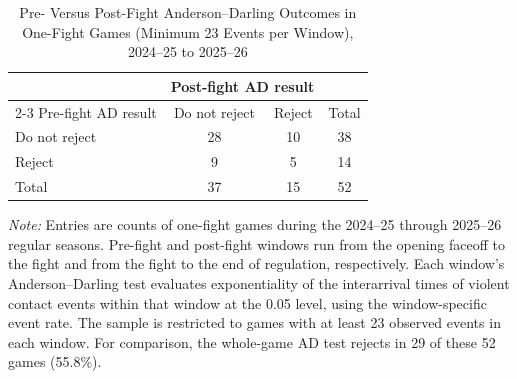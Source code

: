 \begin{table}[htbp]
\centering
\caption{Pre- Versus Post-Fight Anderson--Darling Outcomes in One-Fight Games (Minimum 23 Events per Window), 2024--25 to 2025--26}
\label{tab:one_fight_AD_rejection_min_23_20242025_20252026}
\small
\renewcommand{\arraystretch}{1.15}
\setlength{\tabcolsep}{6pt}

\begin{tabular*}{0.78\textwidth}{@{\extracolsep{\fill}}lccc}
\toprule
 & \multicolumn{2}{c}{Post-fight AD result} & \\
\cmidrule(lr){2-3}
Pre-fight AD result & Do not reject & Reject & Total \\
\midrule
Do not reject & 28 & 10 & 38 \\
Reject & 9 & 5 & 14 \\
\midrule
Total & 37 & 15 & 52 \\
\bottomrule
\end{tabular*}

\vspace{0.4em}
\parbox{0.78\textwidth}{
\footnotesize
\textit{Note:} Entries are counts of one-fight games during the 2024--25 through 2025--26 regular seasons. Pre-fight and post-fight windows run from the opening faceoff to the fight and from the fight to the end of regulation, respectively. Each window's Anderson--Darling test evaluates exponentiality of the interarrival times of violent contact events within that window at the 0.05 level, using the window-specific event rate. The sample is restricted to games with at least 23 observed events in each window. For comparison, the whole-game AD test rejects in 29 of these 52 games (55.8\%).
}
\end{table}
